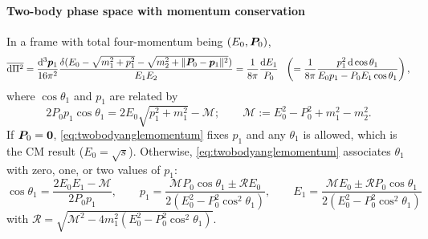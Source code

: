 \documentclass[CheatSheet]{subfiles}
\begin{document}
\paragraph{Two-body phase space with momentum conservation}
In a frame with total four-momentum being $(E_0,{\boldsymbol{P}}_0)$,
\begin{equation}
\overline{\mathop{}\!\mathrm{d}\Pi^2}
=\frac{\mathop{}\!\mathrm{d}^3{\boldsymbol{p}}_1}{16\pi^2}\frac{\delta(E_0-\sqrt{m_1^2+p_1^2}-\sqrt{m_2^2+\|{\boldsymbol{P}}_0-{\boldsymbol{p}}_1\|^2})}{E_1E_2}
=\frac{1}{8\pi}\frac{\mathop{}\!\mathrm{d} E_1}{P_0}
~~\left(=\frac{1}{8\pi}\frac{p_1^2\mathop{}\!\mathrm{d}\cos\theta_{1}}{E_0p_1-P_0E_1\cos\theta_1}\right),
\label{eq:twobodypsgeneral}
\end{equation}
where $\cos\theta_1$ and $p_1$ are related by
\begin{equation}
 2P_0 p_1\cos\theta_1 = 2E_0 \sqrt{p_1^2+m_1^2}-\mathcal M;
\qquad \mathcal M := E_0^2 - P_0^2 +  m_1^2 - m_2^2.
\label{eq:twobodyanglemomentum}
\end{equation}
If ${\boldsymbol{P}}_0={\boldsymbol{0}}$, \cref{eq:twobodyanglemomentum} fixes $p_1$ and any $\theta_1$ is allowed, which is the CM result ($E_0=\sqrt s$).
Otherwise, \cref{eq:twobodyanglemomentum} associates $\theta_1$ with zero, one, or two values of $p_1$:
\begin{equation}
 \cos\theta_1 = \frac{2E_0E_1-\mathcal M}{2P_0p_1},\qquad
p_1=\frac{\mathcal MP_0\cos\theta_1
 \pm \mathcal R E_0
}{2(E_0^2-P_0^2\cos^2\theta_1)},\qquad
E_1=\frac{\mathcal ME_0
 \pm \mathcal RP_0\cos\theta_1
}{2(E_0^2-P_0^2\cos^2\theta_1)}
\end{equation}
with $\mathcal R = \sqrt{\mathcal M^2-4m_1^2(E_0^2-P_0^2\cos^2\theta_1)}$.
\end{document}
